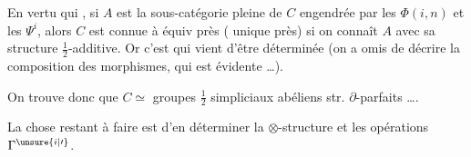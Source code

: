 
En vertu  qui , si $A$ est la sous-catégorie pleine de $C$ engendrée par les $\Phi(i,n)$ et les $\Psi^i$, alors $C$ est connue à équiv près ( unique près) si on connaît $A$ avec sa structure $\frac12$-additive. Or c'est  qui vient d'être déterminée (on a omis de décrire la composition des morphismes, qui est évidente \ldots).

On trouve donc que $C\simeq$ groupes $\frac12$ simpliciaux abéliens str. $\partial$-parfaits \ldots.

La chose restant à faire est d'en déterminer la $\otimes$-structure et les opérations $\Gamma^{\unsure{i|\prime}}$.

